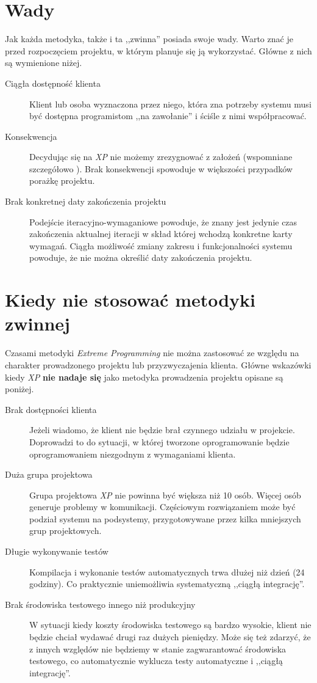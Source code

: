 \section{Wady}
\label{sec:ZMTOwady}

Jak każda metodyka, także i ta ,,zwinna'' posiada swoje wady. Warto znać je przed rozpoczęciem projektu, w którym planuje się ją wykorzystać. Główne z nich są wymienione niżej.

\begin{description}
    \item[Ciągła dostępność klienta]{Klient lub osoba wyznaczona przez niego, która zna potrzeby systemu musi być dostępna programistom ,,na zawołanie'' i ściśle z nimi współpracować.}
    \item[Konsekwencja]{Decydując się na \textit{XP} nie możemy zrezygnować z założeń (wspomniane szczegółowo ). Brak konsekwencji spowoduje w większości przypadków porażkę projektu.}
    \item[Brak konkretnej daty zakończenia projektu]{Podejście iteracyjno-wymaganiowe powoduje, że znany jest jedynie czas zakończenia aktualnej iteracji w skład której wchodzą konkretne karty wymagań. Ciągła możliwość zmiany zakresu i funkcjonalności systemu powoduje, że nie można określić daty zakończenia projektu.}
\end{description}

\section{Kiedy nie stosować metodyki zwinnej}
\label{sec:ZMTOknsm}

Czasami metodyki \textit{Extreme Programming} nie można zastosować ze względu na charakter prowadzonego projektu lub przyzwyczajenia klienta. Główne wskazówki kiedy \textit{XP} \textbf{nie nadaje się} jako metodyka prowadzenia projektu opisane są poniżej.

\begin{description}
    \item[Brak dostępności klienta]Jeżeli wiadomo, że klient nie będzie brał czynnego udziału w projekcie. Doprowadzi to do sytuacji, w której tworzone oprogramowanie będzie oprogramowaniem niezgodnym z wymaganiami klienta.
    \item[Duża grupa projektowa] Grupa projektowa \textit{XP} nie powinna być większa niż 10 osób. Więcej osób generuje problemy w komunikacji. Częściowym rozwiązaniem może być podział systemu na podsystemy, przygotowywane przez kilka mniejszych grup projektowych.
    \item[Długie wykonywanie testów] Kompilacja i wykonanie testów automatycznych trwa dłużej niż dzień (24 godziny). Co praktycznie uniemożliwia systematyczną ,,ciągłą integrację''.
    \item[Brak środowiska testowego innego niż produkcyjny] W sytuacji kiedy koszty środowiska testowego są bardzo wysokie, klient nie będzie chciał wydawać drugi raz dużych pieniędzy. Może się też zdarzyć, że z innych względów nie będziemy w stanie zagwarantować środowiska testowego, co automatycznie wyklucza testy automatyczne i ,,ciągłą integrację''.
\end{description}

